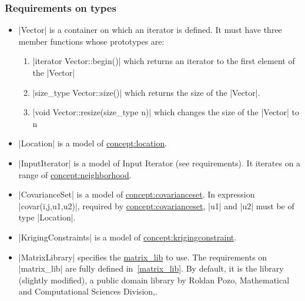 \documentclass[12pt,twoside]{report}
\begin{document}
\htmlrule[CLEAR=all]  \subsubsection*{Requirements on types}
\begin{itemize}
\item |Vector| is a container on which an iterator is defined. It must have three member functions whose prototypes are:
  \begin{enumerate}
  \item |iterator Vector::begin()| which returns an iterator to the first element of the |Vector|
  \item |size_type Vector::size()| which returns the size of the |Vector|.
  \item |void Vector::resize(size_type n)| which changes the size of the |Vector| to n
  \end{enumerate}
\item |Location| is a model of \hyperref{Location}{Location (see Section}{)}{concept:location}.
\item |InputIterator| is a model of Input Iterator (see  requirements). It iterates on a range of \hyperref{Neighborhood}{Neighborhood (see Section}{)}{concept:neighborhood}.
\item |CovarianceSet| is a model of \hyperref{Covariance Set}{Covariance Set}{}{concept:covarianceset}. In expression |covar(i,j,u1,u2)|, required by \hyperref{Covariance Set}{Covariance Set}{}{concept:covarianceset}, |u1| and |u2| must be of type |Location|.
\item |KrigingConstraints| is a model of \hyperref{Kriging Constraint}{Kriging Constraint}{}{concept:krigingconstraint}.
\item |MatrixLibrary| specifies the \hyperref{linear algebra library}{linear algebra library}{}{matrix_lib} to use. The requirements on |matrix_lib| are fully defined in~\ref{matrix_lib}. By default, it is the library (slightly modified), a public domain library by Roldan Pozo, Mathematical and Computational Sciences Division,.
\end{itemize}

\end{document}
